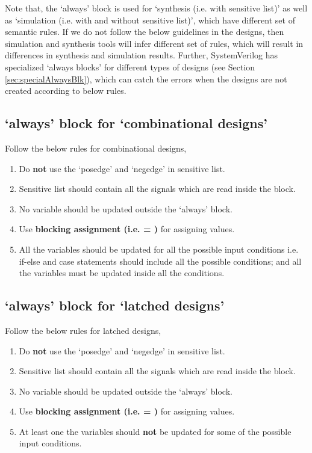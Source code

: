 \begin{noNumBox}
	Note that, the `always' block is used for `synthesis (i.e. with sensitive list)' as well as `simulation (i.e. with and without sensitive list)', which have different set of semantic rules. If we do not follow the below guidelines in the designs, then simulation and synthesis tools will infer different set of rules, which will result in differences in synthesis and simulation results. Further, SystemVerilog has specialized `always blocks' for different types of designs (see Section \ref{sec:specialAlwaysBlk}), which can catch the errors when the designs are not created according to below rules. 
\end{noNumBox}
\subsection{`always' block for `combinational designs'}
Follow the below rules for combinational designs, 
\begin{enumerate}
	\item Do \textbf{not} use the `posedge' and `negedge' in sensitive list. 
	\item Sensitive list should contain all the signals which are read inside the block. 
	\item No variable should be updated outside the `always' block. 
	\item Use \textbf{blocking assignment (i.e. = )} for assigning values. 
	\item All the variables should be updated for all the possible input conditions i.e. if-else and case statements should include all the possible conditions; and all the variables must be updated inside all the conditions. 
\end{enumerate}

\subsection{`always' block for `latched designs'}
Follow the below rules for latched designs, 
\begin{enumerate}
	\item Do \textbf{not} use the `posedge' and `negedge' in sensitive list. 
	\item Sensitive list should contain all the signals which are read inside the block. 
	\item No variable should be updated outside the `always' block. 
	\item Use \textbf{blocking assignment (i.e. = )} for assigning values. 
	\item At least one the variables should \textbf{not} be updated for some of the possible input conditions.
\end{enumerate}

